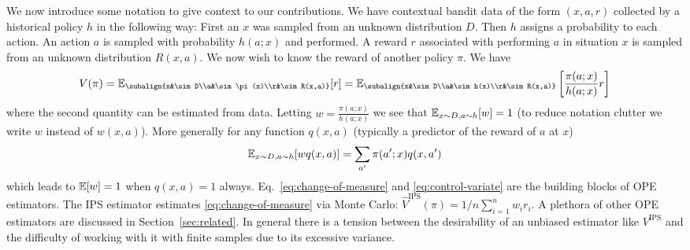We now introduce some notation to give 
context to our contributions.
We have contextual bandit data of the form $(x,a,r)$
collected by a historical policy $h$ in the following way:
First an $x$ was sampled from an unknown distribution $D$. 
Then $h$ assigns a probability to each action. 
An action $a$ is sampled with probability $h(a;x)$
and performed. A reward $r$ associated with performing $a$ in
situation $x$ is sampled from an unknown distribution $R(x,a)$. 
We now wish to know the reward of another policy $\pi$. We have
\begin{equation}
\label{eq:change-of-measure}
V(\pi) = \E_{\subalign{x&\sim D\\a&\sim\pi(x)\\r&\sim R(x,a)}}[r]
=
\E_{\subalign{x&\sim D\\a&\sim h(x)\\r&\sim R(x,a)}}\left[\frac{\pi(a;x)}{h(a;x)}r\right]
\end{equation}
where the second quantity can be estimated from 
data.%
Letting $w=\frac{\pi(a;x)}{h(a;x)}$  we see that 
$\mathbb{E}_{x\sim D,a\sim h}[w]=1$
(to reduce notation 
clutter we write $w$ instead of $w(x,a)$). More generally 
for any function $q(x,a)$ (typically
a predictor of the reward of $a$ at $x$)
\begin{equation}
\label{eq:control-variate}
\mathbb{E}_{x\sim D,a\sim h}[w q(x,a)] = \sum_{a'} \pi(a';x) q(x,a')    
\end{equation}
which leads to $\mathbb{E}[w]=1$ when $q(x,a)=1$ always. Eq.~\eqref{eq:change-of-measure} and \eqref{eq:control-variate}
are the building blocks of OPE estimators.
The IPS estimator \cite{HT52} estimates
\eqref{eq:change-of-measure} via Monte Carlo: $\hat{V}^{\textrm{IPS}}(\pi) = 1/n \sum_{i=1}^n w_i r_i $.
A plethora of other OPE estimators are discussed in Section~\ref{sec:related}. In general there is
a tension between the desirability of an unbiased estimator
like $V^{\textrm{IPS}}$ and the difficulty of working with it
with finite samples due to its excessive variance.


